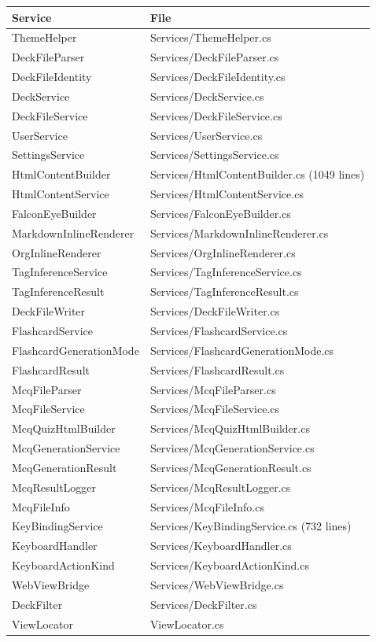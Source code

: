 \documentclass[14pt]{article}
\begin{document}
\begin{center}
\begin{tabular}{ll}
Service & File\\
\hline
ThemeHelper & Services/ThemeHelper.cs\\
DeckFileParser & Services/DeckFileParser.cs\\
DeckFileIdentity & Services/DeckFileIdentity.cs\\
DeckService & Services/DeckService.cs\\
DeckFileService & Services/DeckFileService.cs\\
UserService & Services/UserService.cs\\
SettingsService & Services/SettingsService.cs\\
HtmlContentBuilder & Services/HtmlContentBuilder.cs (1049 lines)\\
HtmlContentService & Services/HtmlContentService.cs\\
FalconEyeBuilder & Services/FalconEyeBuilder.cs\\
MarkdownInlineRenderer & Services/MarkdownInlineRenderer.cs\\
OrgInlineRenderer & Services/OrgInlineRenderer.cs\\
TagInferenceService & Services/TagInferenceService.cs\\
TagInferenceResult & Services/TagInferenceResult.cs\\
DeckFileWriter & Services/DeckFileWriter.cs\\
FlashcardService & Services/FlashcardService.cs\\
FlashcardGenerationMode & Services/FlashcardGenerationMode.cs\\
FlashcardResult & Services/FlashcardResult.cs\\
McqFileParser & Services/McqFileParser.cs\\
McqFileService & Services/McqFileService.cs\\
McqQuizHtmlBuilder & Services/McqQuizHtmlBuilder.cs\\
McqGenerationService & Services/McqGenerationService.cs\\
McqGenerationResult & Services/McqGenerationResult.cs\\
McqResultLogger & Services/McqResultLogger.cs\\
McqFileInfo & Services/McqFileInfo.cs\\
KeyBindingService & Services/KeyBindingService.cs (732 lines)\\
KeyboardHandler & Services/KeyboardHandler.cs\\
KeyboardActionKind & Services/KeyboardActionKind.cs\\
WebViewBridge & Services/WebViewBridge.cs\\
DeckFilter & Services/DeckFilter.cs\\
ViewLocator & ViewLocator.cs\\
\end{tabular}
\end{center}
\end{document}
